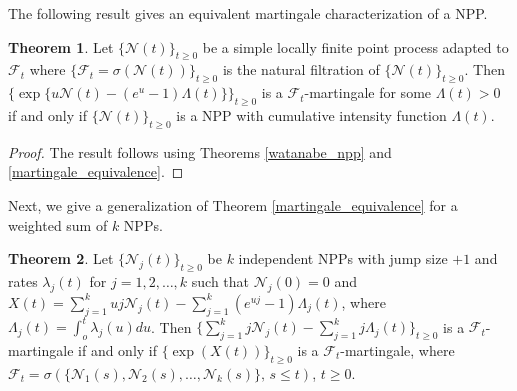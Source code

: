 \documentclass[11pt,oneside,reqno]{amsart}
\theoremstyle{definition}
\newtheorem{theorem}{\bf Theorem}[section]
\theoremstyle{remarkstyle}
\begin{document}
The following result gives an equivalent martingale characterization of a NPP.
\begin{theorem}\label{exponential_npp}
Let $\{\mathcal{N}(t)\}_{t\ge 0}$ be a simple locally finite point process adapted to $\mathcal{F}_t$ where $\{\mathcal{F}_t=\sigma(\mathcal{N}(t))\}_{t\ge 0}$ is the natural filtration of $\{\mathcal{N}(t)\}_{t\ge 0}$. Then $\{\exp\{u\mathcal{N}(t)-(e^u-1)\Lambda(t)\}\}_{t\ge 0}$ is a $\mathcal{F}_t$-martingale for some $\Lambda(t)>0$ if and only if $\{\mathcal{N}(t)\}_{t\ge 0}$ is a NPP with cumulative intensity function $\Lambda(t)$.
\end{theorem}
\begin{proof}
The result follows using Theorems \ref{watanabe_npp} and \ref{martingale_equivalence}.
\end{proof}
Next, we give a generalization of Theorem \ref{martingale_equivalence} for a weighted sum of $k$ NPPs.
\begin{theorem}\label{martingale_equivalence_ngcp}
    Let $\{\mathcal{N}_j(t)\}_{t\ge 0}$ be $k$ independent NPPs with jump size $+1$ and rates $\lambda_j(t)$ for $j=1,2,\dots,k$ such that $\mathcal{N}_j(0)=0$ and $X(t)=\sum_{j=1}^{k}uj\mathcal{N}_j(t)-\sum_{j=1}^{k}(e^{uj}-1)\Lambda_j(t)$, where $\Lambda_j(t)=\int_{o}^{t}\lambda_j(u)du$. Then $\{\sum_{j=1}^{k}j\mathcal{N}_j(t)-\sum_{j=1}^{k}j\Lambda_j(t)\}_{t\ge 0}$ is a $\mathcal{F}_t$-martingale if and only if $\{\exp\left(X(t)\right)\}_{t\ge 0}$ is a $\mathcal{F}_t$-martingale, where $\mathcal{F}_t=\sigma(\{\mathcal{N}_1(s),\mathcal{N}_2(s),\dots,\mathcal{N}_k(s)\},\,s\le t)$, $t\ge 0$.   
\end{theorem}
\end{document}
